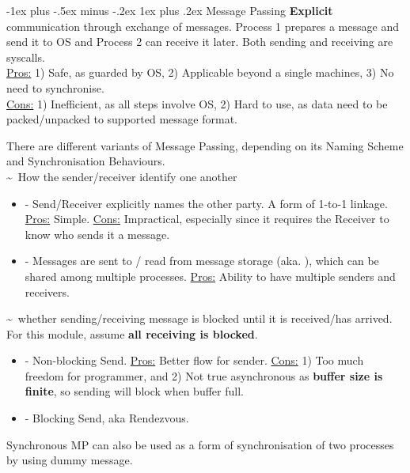 \documentclass[10pt,landscape,letterpaper]{article}
\makeatletter
\renewcommand{\subsubsection}{\@startsection{subsubsection}{3}{0mm}%
                                {-1ex plus -.5ex minus -.2ex}%
                                {1ex plus .2ex}%
                                {\normalfont\small\itshape}}
\makeatother
\begin{document}
\begin{multicols}{3}
\subsubsection{Message Passing}
\textbf{Explicit} communication through exchange of messages. Process 1 prepares a message and send it to OS and Process 2 can receive it later. Both sending and receiving are syscalls.
\\
\underline{Pros:} 1) Safe, as guarded by OS, 2) Applicable beyond a single machines, 3) No need to synchronise.
\\
\underline{Cons:} 1) Inefficient, as all steps involve OS, 2) Hard to use, as data need to be packed/unpacked to supported message format.

\medskip

There are different variants of Message Passing, depending on its Naming Scheme and Synchronisation Behaviours.
\\
 \textasciitilde \ How the sender/receiver identify one another
\begin{itemize}
    \item {} - Send/Receiver explicitly names the other party. A form of 1-to-1 linkage. \underline{Pros:} Simple. \underline{Cons:} Impractical, especially since it requires the Receiver to know who sends it a message.
    \item {} - Messages are sent to / read from message storage (aka. ), which can be shared among multiple processes. \underline{Pros:} Ability to have multiple senders and receivers.
\end{itemize}

 \textasciitilde \ whether sending/receiving message is blocked until it is received/has arrived. For this module, assume \textbf{all receiving is blocked}.
\begin{itemize}
    \item {} - Non-blocking Send. \underline{Pros:} Better flow for sender. \underline{Cons:} 1) Too much freedom for programmer, and 2) Not true asynchronous as \textbf{buffer size is finite}, so sending will block when buffer full.
    \item {} - Blocking Send, aka Rendezvous.
\end{itemize}
Synchronous MP can also be used as a form of synchronisation of two processes by using dummy message.




\end{multicols}
\end{document}

